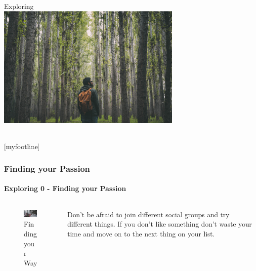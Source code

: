 \documentclass[aspectratio=169]{beamer}
\begin{document}

\begin{frame}[t]
  \begin{center}
    \begingroup
    \fontsize{20pt}{20pt}\selectfont
    Exploring \\
    \endgroup
    \bigskip
    \includegraphics[width=9cm,keepaspectratio]{exploring} \\
    \bigskip
    \inserttitle \\
  \end{center}
\end{frame}

[myfootline]

\begin{frame}
  \frametitle{Finding your Passion}
  \framesubtitle{Exploring 0 - Finding your Passion}
  \begin{columns}[onlytextwidth]
    \begin{column}{.30\textwidth}
      \begin{figure}
        \includegraphics[width=5.5cm,keepaspectratio]{compass}
        \caption{Finding your Way}
      \end{figure}
    \end{column}
    \hfill
    \begin{column}{.60\textwidth}
        \begin{tcolorbox}[title=finding\_your\_passion.log,colback=gray]
          Don't be afraid to join different social groups and try different things.
          If you don't like something don't waste your time and move on to the next thing on your list.
        \end{tcolorbox}
    \end{column}
  \end{columns}
\end{frame}
\end{document}
